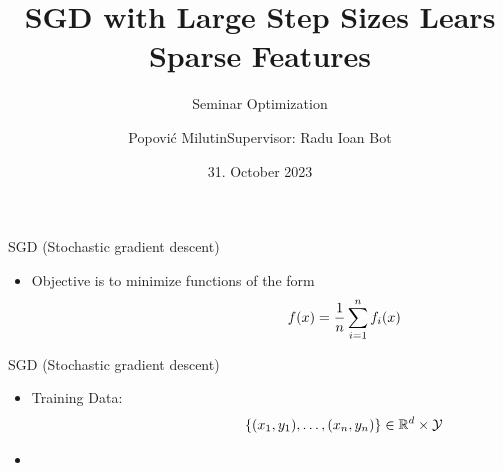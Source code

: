 \documentclass[fleqn]{beamer}
\title
{SGD with Large Step Sizes Lears Sparse Features}
\subtitle{Seminar Optimization}
\author[Popović Milutin]
{Popović Milutin\newline\newline Supervisor: Radu Ioan Bot}
\date{31. October 2023}
\begin{document}
    \begin{frame}
        \titlepage
    \end{frame}

    \begin{frame}{SGD (Stochastic gradient descent)}
        \begin{itemize}
            \item Objective is to minimize functions of the
                form
                \begin{align*}
                    \hspace{0.3\linewidth}
                    f(x) = \frac{1}{n} \sum_{i=1}^{n} f_i(x)
            \end{align*}
        \end{itemize}
    \end{frame}

    \begin{frame}{SGD (Stochastic gradient descent)}
        \begin{itemize}
            \item Training Data:
                \begin{align*}
                    \hspace{0.3\linewidth}
                    \{(x_1, y_1),\ldots,(x_n,y_n)\} \in \mathbb{R}^{d} \times
                    \mathcal{Y}
            \end{align*}
        \item \mbox{}
        \end{itemize}
    \end{frame}
\end{document}
